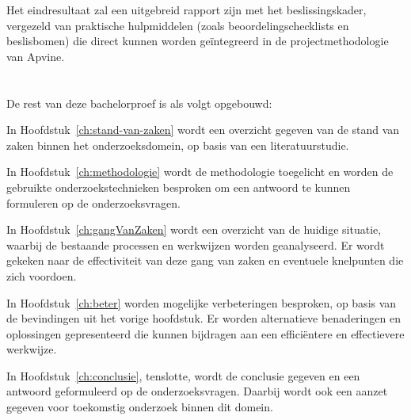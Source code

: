 Het eindresultaat zal een uitgebreid rapport zijn met het beslissingskader, vergezeld van praktische hulpmiddelen (zoals beoordelingschecklists en beslisbomen) die direct kunnen worden geïntegreerd in de projectmethodologie van Apvine.

\section{}%
\label{sec:opzet-bachelorproef}


De rest van deze bachelorproef is als volgt opgebouwd:

In Hoofdstuk~\ref{ch:stand-van-zaken} wordt een overzicht gegeven van de stand van zaken binnen het onderzoeksdomein, op basis van een literatuurstudie.

In Hoofdstuk~\ref{ch:methodologie} wordt de methodologie toegelicht en worden de gebruikte onderzoekstechnieken besproken om een antwoord te kunnen formuleren op de onderzoeksvragen.


In Hoofdstuk~\ref{ch:gangVanZaken} wordt een overzicht van de huidige situatie, waarbij de bestaande processen en werkwijzen worden geanalyseerd. Er wordt gekeken naar de effectiviteit van deze gang van zaken en eventuele knelpunten die zich voordoen.

In Hoofdstuk~\ref{ch:beter} worden mogelijke verbeteringen besproken, op basis van de bevindingen uit het vorige hoofdstuk. Er worden alternatieve benaderingen en oplossingen gepresenteerd die kunnen bijdragen aan een efficiëntere en effectievere werkwijze.

In Hoofdstuk~\ref{ch:conclusie}, tenslotte, wordt de conclusie gegeven en een antwoord geformuleerd op de onderzoeksvragen. Daarbij wordt ook een aanzet gegeven voor toekomstig onderzoek binnen dit domein.